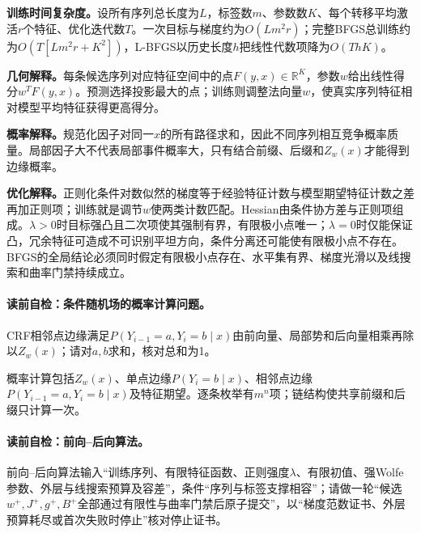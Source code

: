 \label{struct:V3-C06-CH26}
\textbf{训练时间复杂度。}设所有序列总长度为$L$，标签数$m$、参数数$K$、每个转移平均激活$r$个特征、优化迭代数$T$。一次目标与梯度约为$O(Lm^2r)$；完整BFGS总训练约为$O(T[Lm^2r+K^2])$，L-BFGS以历史长度$h$把线性代数项降为$O(ThK)$。

\label{struct:V3-C06-CH14}
\textbf{几何解释。}每条候选序列对应特征空间中的点$F(y,x)\in\mathbb R^K$，参数$w$给出线性得分$w^TF(y,x)$。预测选择投影最大的点；训练则调整法向量$w$，使真实序列特征相对模型平均特征获得更高得分。

\label{struct:V3-C06-CH15}
\textbf{概率解释。}规范化因子对同一$x$的所有路径求和，因此不同序列相互竞争概率质量。局部因子大不代表局部事件概率大，只有结合前缀、后缀和$Z_w(x)$才能得到边缘概率。

\textbf{优化解释。}正则化条件对数似然的梯度等于经验特征计数与模型期望特征计数之差再加正则项；训练就是调节$w$使两类计数匹配。Hessian由条件协方差与正则项组成。$\lambda>0$时目标强凸且二次项使其强制有界，有限极小点唯一；$\lambda=0$时仅能保证凸，冗余特征可造成不可识别平坦方向，条件分离还可能使有限极小点不存在。BFGS的全局结论必须同时假定有限极小点存在、水平集有界、梯度光滑以及线搜索和曲率门禁持续成立。


\paragraph{读前自检：条件随机场的概率计算问题。}CRF相邻点边缘满足$P(Y_{i-1}=a,Y_i=b\mid x)$由前向量、局部势和后向量相乘再除以$Z_w(x)$；请对$a,b$求和，核对总和为1。\par

概率计算包括$Z_w(x)$、单点边缘$P(Y_i=b\mid x)$、相邻点边缘$P(Y_{i-1}=a,Y_i=b\mid x)$及特征期望。逐条枚举有$m^n$项；链结构使共享前缀和后缀只计算一次。

\paragraph{读前自检：前向--后向算法。}前向--后向算法输入“训练序列、有限特征函数、正则强度$\lambda$、有限初值、强Wolfe参数、外层与线搜索预算及容差”，条件“序列与标签支撑相容”；请做一轮“候选$w^+,J^+,g^+,B^+$全部通过有限性与曲率门禁后原子提交”，以“梯度范数证书、外层预算耗尽或首次失败时停止”核对停止证书。\par

